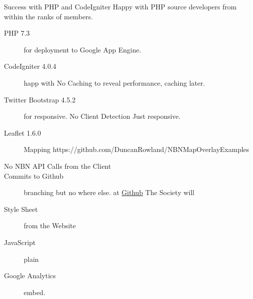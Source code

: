 \documentclass[a4paper,12pt,landscape,twocolumn]{article}
\begin{document}
Success with PHP and CodeIgniter
Happy with PHP source developers from within the ranks of members.

\begin{description}
    \item[PHP 7.3] for deployment to Google App Engine.
    \item[CodeIgniter 4.0.4] happ with 
        No Caching to reveal performance, caching later.
    \item[Twitter Bootstrap 4.5.2] for responsive.
        No Client Detection Just responsive.
    \item[Leaflet 1.6.0] Mapping https://github.com/DuncanRowland/NBNMapOverlayExamples
    \item[No NBN API Calls from the Client] 
    \item[Commits to Github] branching but no where else.
        at \href{https://github.com/joejcollins/captain-magenta.git}{Github}
      The Society will
    \item[Style Sheet] from the Website
    \item[JavaScript] plain 
    \item[Google Analytics] embed.
\end{description}
\end{document}

